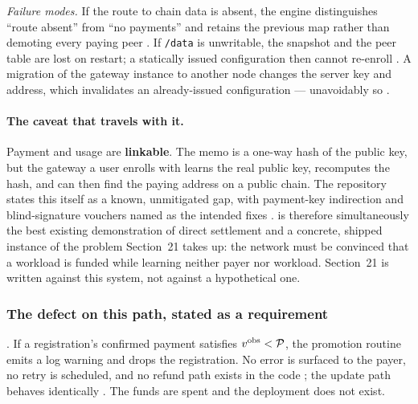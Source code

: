 \begin{construction}
\emph{Failure modes.} If the route to chain data is absent, the engine distinguishes ``route absent''
from ``no payments'' and retains the previous map rather than demoting every paying peer
. If \texttt{/data} is unwritable, the snapshot and the
peer table are lost on restart; a statically issued configuration then cannot re-enroll
. A migration of the gateway
instance to another node changes the server key and address, which invalidates an already-issued
configuration --- unavoidably so .
\end{construction}

\paragraph{The caveat that travels with it.}
Payment and usage are \textbf{linkable}. The memo is a one-way hash of the public key, but the
gateway a user enrolls with learns the real public key, recomputes the hash, and can then find the
paying address on a public chain. The repository states this itself as a known, unmitigated gap, with
payment-key indirection and blind-signature vouchers named as the intended fixes
. \CumulusVPN is therefore simultaneously the best
existing demonstration of direct settlement and a concrete, shipped instance of the problem
Section~21 takes up: the network must be convinced that a workload is funded while learning neither
payer nor workload. Section~21 is written against this system, not against a hypothetical one.

\subsubsection{The defect on this path, stated as a requirement}

\begin{property}
\label{prop:silentunderpay}
\shipped. If a registration's confirmed payment satisfies $v^{\mathrm{obs}} < \mathcal{P}$, the promotion
routine emits a log warning and drops the registration. No error is surfaced to the payer, no retry
is scheduled, and no refund path exists in the code
; the update path
behaves identically .
The funds are spent and the deployment does not exist.
\end{property}

